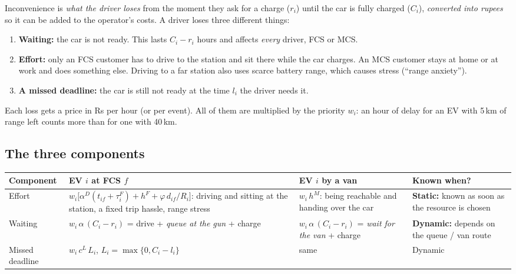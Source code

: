 \documentclass[11pt,a4paper]{article}
\begin{document}
Inconvenience is \emph{what the driver loses} from the moment they ask for a charge ($r_i$) until the car is fully charged ($C_i$), \emph{converted into rupees} so it can be added to the operator's costs. A driver loses three different things:

\begin{enumerate}[leftmargin=1.6em,itemsep=2pt]
  \item \textbf{Waiting:} the car is not ready. This lasts $C_i-r_i$ hours and affects \emph{every} driver, FCS or MCS.
  \item \textbf{Effort:} only an FCS customer has to drive to the station and sit there while the car charges. An MCS customer stays at home or at work and does something else. Driving to a far station also uses scarce battery range, which causes stress (``range anxiety'').
  \item \textbf{A missed deadline:} the car is still not ready at the time $l_i$ the driver needs it.
\end{enumerate}

Each loss gets a price in Rs per hour (or per event). All of them are multiplied by the priority $w_i$: an hour of delay for an EV with 5\,km of range left counts more than for one with 40\,km.

\subsection{The three components}

\begin{center}
\renewcommand{\arraystretch}{1.3}
\begin{tabularx}{\textwidth}{@{}>{\raggedright\arraybackslash}p{2.6cm}>{\raggedright\arraybackslash}X>{\raggedright\arraybackslash}X>{\raggedright\arraybackslash}p{3.0cm}@{}}
\toprule
\textbf{Component} & \textbf{EV $i$ at FCS $f$} & \textbf{EV $i$ by a van} & \textbf{Known when?} \\
\midrule
Effort & $w_i\big[\alpha^D(t_{if}+\tau^F_i)+h^F+\varphi\,d_{if}/R_i\big]$: driving and sitting at the station, a fixed trip hassle, range stress & $w_i\,h^M$: being reachable and handing over the car & \textbf{Static:} known as soon as the resource is chosen \\
Waiting & $w_i\,\alpha\,(C_i-r_i)$ = drive + \emph{queue at the gun} + charge & $w_i\,\alpha\,(C_i-r_i)$ = \emph{wait for the van} + charge & \textbf{Dynamic:} depends on the queue / van route \\
Missed deadline & $w_i\,c^L\,L_i$, $L_i=\max\{0,C_i-l_i\}$ & same & Dynamic \\
\bottomrule
\end{tabularx}
\end{center}
\end{document}
